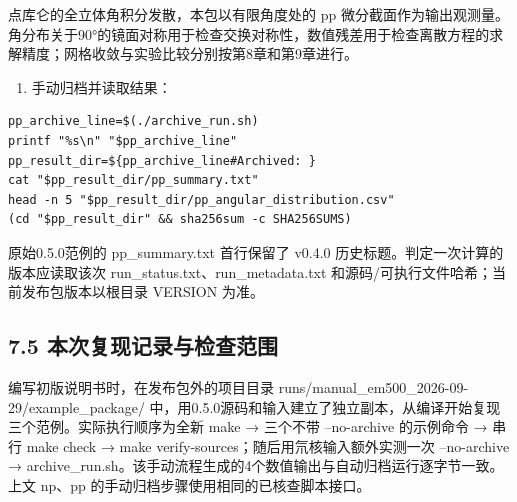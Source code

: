 \documentclass[UTF8,a4paper,zihao=5,fontset=fandol]{ctexart}
\begin{document}
点库仑的全立体角积分发散，本包以有限角度处的 pp 微分截面作为输出观测量。角分布关于90°的镜面对称用于检查交换对称性，数值残差用于检查离散方程的求解精度；网格收敛与实验比较分别按第8章和第9章进行。

\begin{enumerate}[start=3]
\item 手动归档并读取结果：


\end{enumerate}

\begin{Verbatim}[samepage=true,breaklines=true,breakanywhere=true,fontsize=\small,frame=leftline,framesep=3mm,rulecolor=\color{bluegray}]
pp_archive_line=$(./archive_run.sh)
printf "%s\n" "$pp_archive_line"
pp_result_dir=${pp_archive_line#Archived: }
cat "$pp_result_dir/pp_summary.txt"
head -n 5 "$pp_result_dir/pp_angular_distribution.csv"
(cd "$pp_result_dir" && sha256sum -c SHA256SUMS)
\end{Verbatim}
原始0.5.0范例的 {\ttfamily\small pp\_\allowbreak{}summary.\allowbreak{}txt} 首行保留了 {\ttfamily\small v0.\allowbreak{}4.\allowbreak{}0} 历史标题。判定一次计算的版本应读取该次 {\ttfamily\small run\_\allowbreak{}status.\allowbreak{}txt}、{\ttfamily\small run\_\allowbreak{}metadata.\allowbreak{}txt} 和源码/可执行文件哈希；当前发布包版本以根目录 {\ttfamily\small VERSION} 为准。

\subsection*{7.5 本次复现记录与检查范围}
编写初版说明书时，在发布包外的项目目录 {\ttfamily\small runs/\allowbreak{}manual\_\allowbreak{}em500\_\allowbreak{}2026-09-29/\allowbreak{}example\_\allowbreak{}package/\allowbreak{}} 中，用0.5.0源码和输入建立了独立副本，从编译开始复现三个范例。实际执行顺序为全新 {\ttfamily\small make} → 三个不带 {\ttfamily\small --no-archive} 的示例命令 → 串行 {\ttfamily\small make check} → {\ttfamily\small make verify-sources}；随后用氘核输入额外实测一次 {\ttfamily\small --no-archive} → {\ttfamily\small archive\_\allowbreak{}run.\allowbreak{}sh}。该手动流程生成的4个数值输出与自动归档运行逐字节一致。上文 np、pp 的手动归档步骤使用相同的已核查脚本接口。
\end{document}
